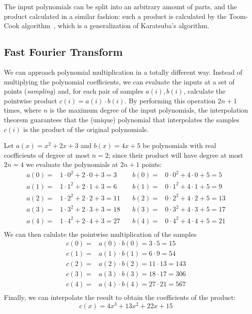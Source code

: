The input polynomials can be split into an arbitrary amount of parts, and the product calculated in a similar fashion:
such a product is calculated by the Toom-Cook algorithm~\cite{cook1969minimum}, which is a generalization of Karatsuba's algorithm.

\subsection{Fast Fourier Transform}

We can approach polynomial multiplication in a totally different way. Instead of multiplying the polynomial coefficients, we can
evaluate the inputs at a set of points (\emph{sampling}) and, for each pair of samples $a(i), b(i)$, calculate the pointwise product
$c(i) = a(i)\cdot b(i)$. By performing this operation $2n+1$ times, where $n$ is the maximum degree of the input polynomials, the interpolation
theorem guarantees that the (unique) polynomial that interpolates the samples $c(i)$ is the product of the original polynomials.
\begin{example}
    Let $a(x) = x^2 + 2x + 3$ and $b(x) = 4x + 5$ be polynomials with real coefficients of degree at most $n=2$; since their product
    will have degree at most $2n=4$ we evaluate the polynomials at $2n+1$ points:
    \begin{align*}
        a(0) = &1\cdot 0^2 + 2\cdot 0 + 3 = 3 \quad &b(0) = &0\cdot 0^2 + 4\cdot 0 + 5 = 5 \\
        a(1) = &1\cdot 1^2 + 2\cdot 1 + 3 = 6 \quad &b(1) = &0\cdot 1^2 + 4\cdot 1 + 5 = 9 \\
        a(2) = &1\cdot 2^2 + 2\cdot 2 + 3 = 11 \quad &b(2) = &0\cdot 2^2 + 4\cdot 2 + 5 = 13 \\
        a(3) = &1\cdot 3^2 + 2\cdot 3 + 3 = 18 \quad &b(3) = &0\cdot 3^2 + 4\cdot 3 + 5 = 17 \\
        a(4) = &1\cdot 4^2 + 2\cdot 4 + 3 = 27 \quad &b(4) = &0\cdot 4^2 + 4\cdot 4 + 5 = 21 \\
    \end{align*}
    We can then calulate the pointwise multiplication of the samples
    \begin{align*}
        c(0) = &a(0)\cdot b(0) = 3\cdot 5 = 15 \\
        c(1) = &a(1)\cdot b(1) = 6\cdot 9 = 54 \\
        c(2) = &a(2)\cdot b(2) = 11\cdot 13 = 143 \\
        c(3) = &a(3)\cdot b(3) = 18\cdot 17 = 306 \\
        c(4) = &a(4)\cdot b(4) = 27\cdot 21 = 567 \\
    \end{align*}
    Finally, we can interpolate the result to obtain the coefficients of the product:
    \begin{equation*}
        c(x) = 4x^3 + 13x^2 + 22x + 15
    \end{equation*}
\end{example}
